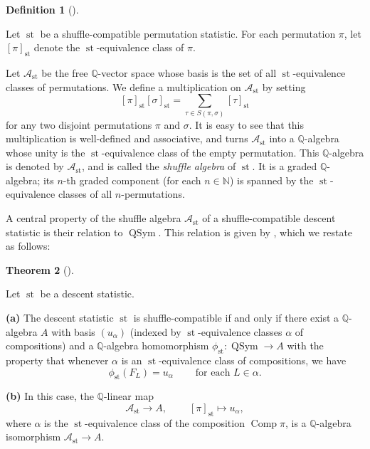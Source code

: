 \documentclass[numbers=enddot,12pt,final,onecolumn,notitlepage]{scrartcl}%
\theoremstyle{definition}
\newtheorem{theo}{Theorem}[section]
\newenvironment{theorem}[1][]
{\begin{theo}[#1]\begin{leftbar}}
{\end{leftbar}\end{theo}}
\newtheorem{defi}[theo]{Definition}
\newenvironment{definition}[1][]
{\begin{defi}[#1]\begin{leftbar}}
{\end{leftbar}\end{defi}}
\let\sumnonlimits\sum
\renewcommand{\sum}{\sumnonlimits\limits}
\begin{document}
\begin{definition}
\label{def.Ast}Let $\operatorname*{st}$ be a shuffle-compatible permutation
statistic. For each permutation $\pi$, let $\left[  \pi\right]
_{\operatorname*{st}}$ denote the $\operatorname*{st}$-equivalence class of
$\pi$.

Let $\mathcal{A}_{\operatorname*{st}}$ be the free $\mathbb{Q}$-vector space
whose basis is the set of all $\operatorname*{st}$-equivalence classes of
permutations. We define a multiplication on $\mathcal{A}_{\operatorname*{st}}$
by setting%
\[
\left[  \pi\right]  _{\operatorname*{st}}\left[  \sigma\right]
_{\operatorname*{st}}=\sum_{\tau\in S\left(  \pi,\sigma\right)  }\left[
\tau\right]  _{\operatorname*{st}}%
\]
for any two disjoint permutations $\pi$ and $\sigma$. It is easy to see that
this multiplication is well-defined and associative, and turns $\mathcal{A}%
_{\operatorname*{st}}$ into a $\mathbb{Q}$-algebra whose unity is the
$\operatorname*{st}$-equivalence class of the empty permutation. This
$\mathbb{Q}$-algebra is denoted by $\mathcal{A}_{\operatorname*{st}}$, and is
called the \textit{shuffle algebra} of $\operatorname*{st}$. It is a graded
$\mathbb{Q}$-algebra; its $n$-th graded component (for each $n\in\mathbb{N}$)
is spanned by the $\operatorname*{st}$-equivalence classes of all $n$-permutations.
\end{definition}

A central property of the shuffle algebra $\mathcal{A}_{\operatorname*{st}}$
of a shuffle-compatible descent statistic is their relation to
$\operatorname*{QSym}$. This relation is given by \cite[Theorem 4.3]{part1},
which we restate as follows:

\begin{theorem}
\label{thm.4.3}Let $\operatorname*{st}$ be a descent statistic.

\textbf{(a)} The descent statistic $\operatorname*{st}$ is shuffle-compatible
if and only if there exist a $\mathbb{Q}$-algebra $A$ with basis $\left(
u_{\alpha}\right)  $ (indexed by $\operatorname*{st}$-equivalence classes
$\alpha$ of compositions) and a $\mathbb{Q}$-algebra homomorphism
$\phi_{\operatorname*{st}}:\operatorname*{QSym}\rightarrow A$ with the
property that whenever $\alpha$ is an $\operatorname*{st}$-equivalence class
of compositions, we have%
\[
\phi_{\operatorname*{st}}\left(  F_{L}\right)  =u_{\alpha}%
\ \ \ \ \ \ \ \ \ \ \text{for each }L\in\alpha.
\]


\textbf{(b)} In this case, the $\mathbb{Q}$-linear map%
\[
\mathcal{A}_{\operatorname*{st}}\rightarrow A,\ \ \ \ \ \ \ \ \ \ \left[
\pi\right]  _{\operatorname*{st}}\mapsto u_{\alpha},
\]
where $\alpha$ is the $\operatorname*{st}$-equivalence class of the
composition $\operatorname*{Comp}\pi$, is a $\mathbb{Q}$-algebra isomorphism
$\mathcal{A}_{\operatorname*{st}}\rightarrow A$.
\end{theorem}
\end{document}
